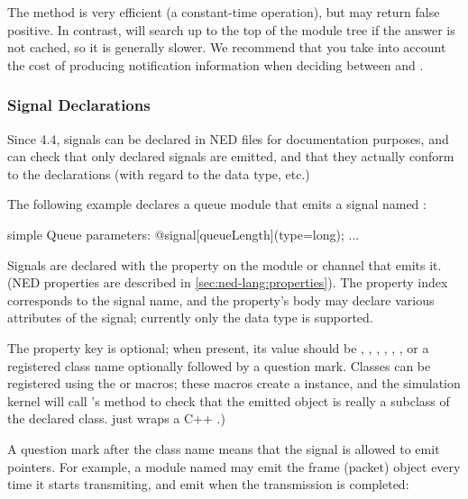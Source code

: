 The  method is very efficient (a constant-time
operation), but may return false positive. In contrast,
 will search up to the top of the module tree if
the answer is not cached, so it is generally slower. We recommend that
you take into account the cost of producing notification information when
deciding between  and .


\subsubsection{Signal Declarations}
\label{sec:simple-modules:signal-declarations}

Since {\opp} 4.4, signals can be declared in NED files for documentation
purposes, and {\opp} can check that only declared signals are emitted,
and that they actually conform to the declarations (with regard to the
data type, etc.)

The following example declares a queue module that emits a signal named
:

\begin{ned}
simple Queue
{
    parameters:
        @signal[queueLength](type=long);
        ...
}
\end{ned}

Signals are declared with the  property on
the module or channel that emits it. (NED properties are described in
\ref{sec:ned-lang:properties}). The property index corresponds
to the signal name, and the property's body may declare various attributes
of the signal; currently only the data type is supported.

The  property key is optional; when present, its value should be
, , , , ,
, or a registered class name optionally followed by a question
mark. Classes can be registered using the  or
 macros; these macros create a
 instance, and the simulation kernel will call
's  method to check that the
emitted object is really a subclass of the declared class.
 just wraps a C++ .)

A question mark after the class name means that the signal is allowed to
emit  pointers. For example, a module named  may emit
the frame (packet) object every time it starts transmiting, and emit
 when the transmission is completed:

